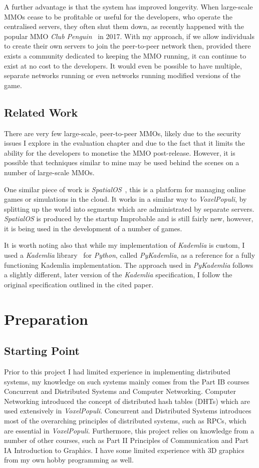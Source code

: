 \documentclass[12pt,notitlepage,a4paper]{report}
\newcommand{\python}{\emph{Python}}
\newcommand{\kademlia}{\emph{Kademlia}}
\newcommand{\voxpop}{\emph{VoxelPopuli}}
\begin{document}
	A further advantage is that the system has improved longevity. When large-scale MMOs cease to be profitable or useful for the developers, who operate the centralised servers, they often shut them down, as recently happened with the popular MMO \emph{Club Penguin}~\cite{clubpenguin} in 2017. With my approach, if we allow individuals to create their own servers to join the peer-to-peer network then, provided there exists a community dedicated to keeping the MMO running, it can continue to exist at no cost to the developers. It would even be possible to have multiple, separate networks running or even networks running modified versions of the game.
	
	\section{Related Work}
	There are very few large-scale, peer-to-peer MMOs, likely due to the security issues I explore in the evaluation chapter and due to the fact that it limits the ability for the developers to monetise the MMO post-release. However, it is possible that techniques similar to mine may be used behind the scenes on a number of large-scale MMOs.
	
	One similar piece of work is \emph{SpatialOS}~\cite{SpatialOS}, this is a platform for managing online games or simulations in the cloud. It works in a similar way to \voxpop{}, by splitting up the world into segments which are administrated by separate servers. \emph{SpatialOS} is produced by the startup Improbable and is still fairly new, however, it is being used in the development of a number of games.
	
	It is worth noting also that while my implementation of \kademlia{} is custom, I used a \kademlia{} library~\cite{pykademlia} for \python{}, called \emph{PyKademlia}, as a reference for a fully functioning Kademlia implementation. The approach used in \emph{PyKademlia} follows a slightly different, later version of the \kademlia{} specification, I follow the original specification outlined in the cited paper.
	
	\clearpage
	\chapter{Preparation}
	
	\section{Starting Point}
	Prior to this project I had limited experience in implementing distributed systems, my knowledge on such systems mainly comes from the Part IB courses Concurrent and Distributed Systems and Computer Networking. Computer Networking introduced the concept of distributed hash tables (DHTs) which are used extensively in \voxpop{}. Concurrent and Distributed Systems introduces most of the overarching principles of distributed systems, such as RPCs, which are essential in \voxpop{}. Furthermore, this project relies on knowledge from a number of other courses, such as Part II Principles of Communication and Part IA Introduction to Graphics. I have some limited experience with 3D graphics from my own hobby programming as well.
	
\end{document}
